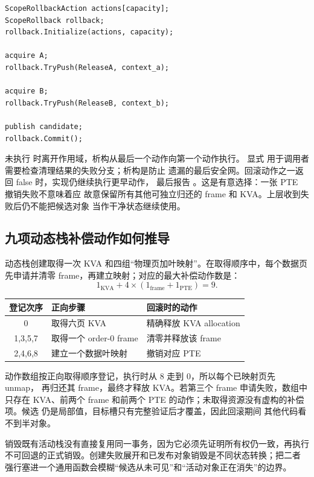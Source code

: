 \begin{verbatim}
ScopeRollbackAction actions[capacity];
ScopeRollback rollback;
rollback.Initialize(actions, capacity);

acquire A;
rollback.TryPush(ReleaseA, context_a);

acquire B;
rollback.TryPush(ReleaseB, context_b);

publish candidate;
rollback.Commit();
\end{verbatim}

未执行  时离开作用域，析构从最后一个动作向第一个动作执行。
显式  用于调用者需要检查清理结果的失败分支；析构是防止
遗漏的最后安全网。回滚动作之一返回 false 时，实现仍继续执行更早动作，
最后报告 。这是有意选择：一张 PTE 撤销失败不意味着应
故意保留所有其他可独立归还的 frame 和 KVA。上层收到失败后仍不能把候选对象
当作干净状态继续使用。

\subsection{九项动态栈补偿动作如何推导}

动态栈创建取得一次 KVA 和四组“物理页加叶映射”。在取得顺序中，每个数据页
先申请并清零 frame，再建立映射；对应的最大补偿动作数是：
\[
  1_{\mathrm{KVA}}+
  4\times
  \left(1_{\mathrm{frame}}+1_{\mathrm{PTE}}\right)=9.
\]

\begin{center}
\begin{tabular}{cll}
\toprule
登记次序 & 正向步骤 & 回滚时的动作\\
\midrule
0 & 取得六页 KVA & 精确释放 KVA allocation\\
1,3,5,7 & 取得一个 order-0 frame & 清零并释放该 frame\\
2,4,6,8 & 建立一个数据叶映射 & 撤销对应 PTE\\
\bottomrule
\end{tabular}
\end{center}

动作数组按正向取得顺序登记，执行时从 8 走到 0，所以每个已映射页先 unmap，
再归还其 frame，最终才释放 KVA。若第三个 frame 申请失败，数组中只存在
KVA、前两个 frame 和前两个 PTE 的动作；未取得资源没有虚构的补偿项。候选
 仍是局部值，目标槽只有完整验证后才覆盖，因此回滚期间
其他代码看不到半对象。

销毁既有活动栈没有直接复用同一事务，因为它必须先证明所有权仍一致，再执行
不可回退的正式销毁。创建失败展开和已发布对象销毁是不同状态转换；把二者
强行塞进一个通用函数会模糊“候选从未可见”和“活动对象正在消失”的边界。

